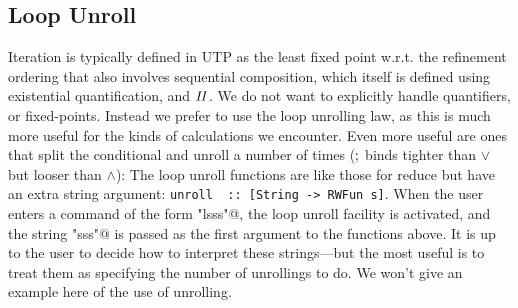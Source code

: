 \subsection{Loop Unroll}


Iteration is typically defined in UTP as the least fixed point
w.r.t. the refinement ordering
that also involves sequential composition,
which itself is defined using existential quantification,
and $\mathit{II}$.
We do not want to explicitly handle quantifiers,
or fixed-points.
Instead we prefer to use the loop unrolling law,
as this is much more useful for the kinds of calculations we encounter.
Even more useful are ones that split the conditional
and unroll a number of times ($\mathrel{;}$ binds tighter than $\lor$
but looser than $\land$):
The loop unroll functions are like those for reduce
but have an extra string argument:
\verb"unroll  :: [String -> RWFun s]".
When the user enters a command of the form \verb@"lsss"@,
the loop unroll facility is activated,
and the string \verb@"sss"@ is passed as the first argument to the functions
above. It is up to the user to decide how to interpret
these strings---but the most useful is to treat them as specifying
the number of unrollings to do.
We won't give an example here of the use of unrolling.
%
%
%
%
%


